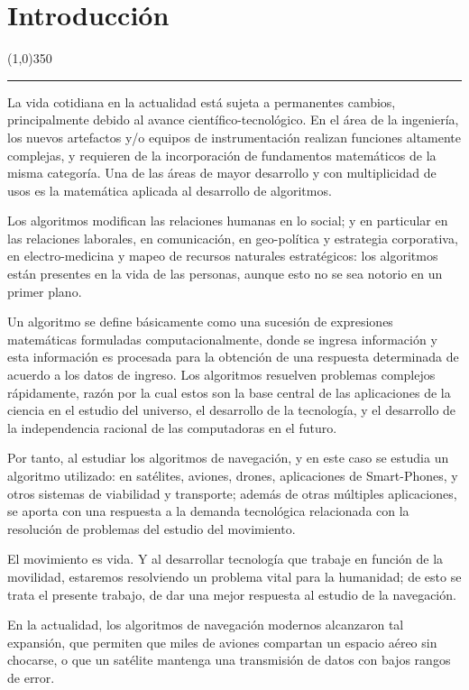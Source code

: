 \documentclass[10pt]{report}
\numberwithin{equation}{chapter}
\numberwithin{algorithm}{chapter}
\begin{document}
\chapter{Introducción}
\begin{center}
\line(1,0){350}\\
\rule[-.4\baselineskip]{1.0\linewidth}{3.2pt}
\end{center}
La vida cotidiana en la actualidad está sujeta a permanentes cambios, principalmente debido al avance científico-tecnológico. En el área de la ingeniería, los nuevos artefactos y/o equipos de instrumentación realizan funciones altamente complejas, y requieren de la incorporación de fundamentos matemáticos de la misma categoría. Una de las áreas de mayor desarrollo y con multiplicidad de usos es la matemática aplicada al desarrollo de algoritmos. \par
Los algoritmos modifican las relaciones humanas en lo social; y en particular en las relaciones laborales, en comunicación, en geo-política y estrategia corporativa, en electro-medicina y mapeo de recursos naturales estratégicos: los algoritmos están presentes en la vida de las personas, aunque esto no se sea notorio en un primer plano.\par
Un algoritmo se define básicamente como una sucesión de expresiones matemáticas formuladas computacionalmente, donde se ingresa información y esta información es procesada para la obtención de una respuesta determinada de acuerdo a los datos de ingreso. Los algoritmos resuelven problemas complejos rápidamente, razón por la cual estos son la base central de las aplicaciones de la ciencia en el estudio del universo, el desarrollo de la tecnología, y el desarrollo de la independencia racional de las computadoras en el futuro.\par
Por tanto, al estudiar los algoritmos de navegación, y en este caso se estudia un algoritmo utilizado: en satélites, aviones, drones, aplicaciones de Smart-Phones, y otros sistemas de viabilidad y transporte; además de otras múltiples aplicaciones, se aporta con una respuesta a la demanda tecnológica relacionada con la resolución de problemas del estudio del movimiento.\par
El movimiento es vida. Y al desarrollar tecnología que trabaje en función de la movilidad, estaremos resolviendo un problema vital para la humanidad; de esto se trata el presente trabajo, de dar una mejor respuesta al estudio de la navegación.\par
En la actualidad, los algoritmos de navegación modernos alcanzaron tal expansión, que permiten que miles de aviones compartan un espacio aéreo sin chocarse, o que un satélite mantenga una transmisión de datos con bajos rangos de error.\par
\end{document}
